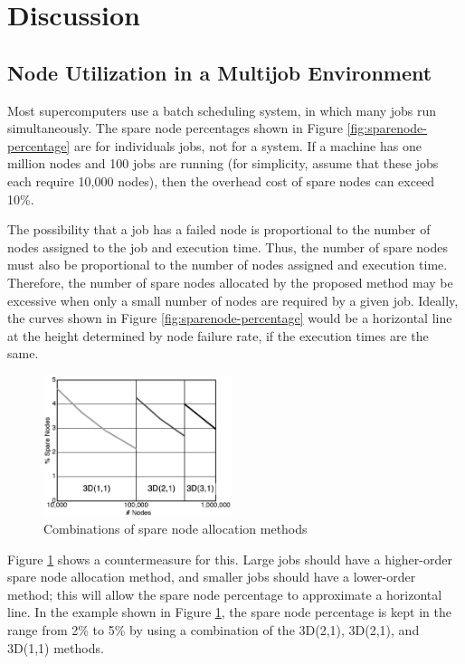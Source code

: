 \documentclass[Afour,times,sagev]{sagej}
\begin{document}
\section{Discussion}

\subsection{Node Utilization in a Multijob Environment}
\label{sec:multi-job}

Most supercomputers use a batch scheduling system, in which many jobs
run simultaneously. The spare node percentages shown in Figure
\ref{fig:sparenode-percentage} are for individuals jobs, not
for a system. If a machine has one million nodes and 100 jobs are running
(for simplicity, assume that these jobs each require 10,000 nodes),
then the overhead cost of spare nodes can exceed 10\%.

The possibility that a job has a failed node is proportional to the
number of nodes assigned to the job and execution time. Thus, the
number of spare nodes must also be proportional to the number of nodes
assigned and execution time. Therefore, the number of spare nodes
allocated by the proposed method may be excessive when only a small
number of nodes are required by a given job. Ideally, the curves shown
in Figure \ref{fig:sparenode-percentage} would be a horizontal line at
the height determined by node failure rate, if the execution times are
the same.

\begin{figure}[ht]
\centering
\includegraphics[width=55mm]{Figs/R-SpareNodes-combo.eps}
  \caption{Combinations of spare node allocation methods}
  \label{fig:combo-percentage}
\end{figure}

Figure \ref{fig:combo-percentage} shows a countermeasure for
this. Large jobs should have a higher-order spare node allocation
method, and smaller jobs should have a lower-order method; this will
allow the spare node percentage to approximate a horizontal line. In
the example shown in Figure \ref{fig:combo-percentage}, the spare node
percentage is kept in the range from 2\% to 5\% by using a combination
of the 3D(2,1), 3D(2,1), and 3D(1,1) methods.
\end{document}
